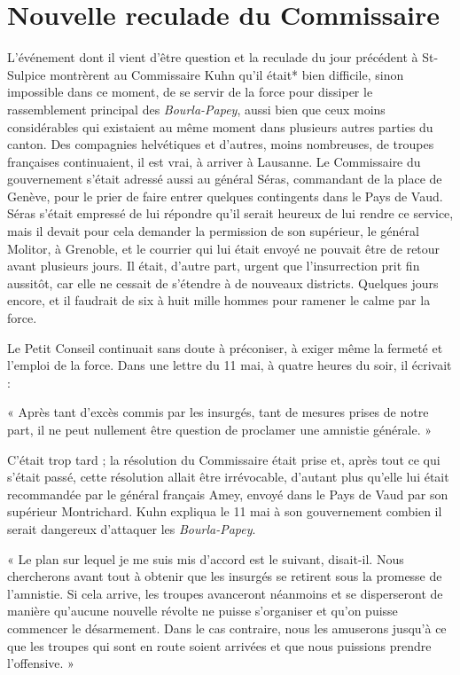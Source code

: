 \documentclass[french,twoside]{book} %
\newenvironment{quoteblock}%
  {\begin{quoting}}
  {\end{quoting}}
\newenvironment{quotebar}{%
    \def\FrameCommand{{\color{rubric!10!}\vrule width 0.5em} \hspace{0.9em}}%
    \def\OuterFrameSep{\itemsep} %
    \MakeFramed {\advance\hsize-\width \FrameRestore}
  }%
  {%
    \endMakeFramed
  }
\renewenvironment{quoteblock}%
  {%
    \savenotes
    \setstretch{0.9}
    \begin{quotebar}
  }
  {%
    \end{quotebar}
    \spewnotes
  }
\begin{document}
\section[Nouvelle reculade du Commissaire]{Nouvelle reculade du Commissaire}
\noindent L’événement dont il vient d’être question et la reculade du jour précédent à St-Sulpice montrèrent au Commissaire Kuhn qu’il était* bien difficile, sinon impossible dans ce moment, de se servir de la force pour dissiper le rassemblement principal des \emph{Bourla-Papey}, aussi bien que ceux moins considérables qui existaient au même moment dans plusieurs autres parties du canton. Des compagnies helvétiques et d’autres, moins nombreuses, de troupes françaises continuaient, il est vrai, à arriver à Lausanne. Le Commissaire du gouvernement s’était adressé aussi au général Séras, commandant de la place de Genève, pour le prier de faire entrer quelques contingents dans le Pays de Vaud. Séras s’était empressé de lui répondre qu’il serait heureux de lui rendre ce service, mais il devait pour cela demander la permission de son supérieur, le général Molitor, à Grenoble, et le courrier qui lui était envoyé ne pouvait être de retour avant plusieurs jours. Il était, d’autre part, urgent que l’insurrection prit fin aussitôt, car elle ne cessait de s’étendre à de nouveaux districts. Quelques jours encore, et il faudrait de six à huit mille hommes pour ramener le calme par la force.\par
Le Petit Conseil continuait sans doute à préconiser, à exiger même la fermeté et l’emploi de la force. Dans une lettre du 11 mai, à quatre heures du soir, il écrivait :\par

\begin{quoteblock}
\noindent « Après tant d’excès commis par les insurgés, tant de mesures prises de notre part, il ne peut nullement être question de proclamer une amnistie générale. »\end{quoteblock}

\noindent C’était trop tard ; la résolution du Commissaire était prise et, après tout ce qui s’était passé, cette résolution allait être irrévocable, d’autant plus qu’elle lui était recommandée par le général français Amey, envoyé dans le Pays de Vaud par son supérieur Montrichard. Kuhn expliqua le 11 mai à son gouvernement combien il serait dangereux d’attaquer les \emph{Bourla-Papey}.\par

\begin{quoteblock}
\noindent « Le plan sur lequel je me suis mis d’accord est le suivant, disait-il. Nous chercherons avant tout à obtenir que les insurgés se retirent sous la promesse de l’amnistie. Si cela arrive, les troupes avanceront néanmoins et se disperseront de manière qu’aucune nouvelle révolte ne puisse s’organiser et qu’on puisse commencer le désarmement. Dans le cas contraire, nous les amuserons jusqu’à ce que les troupes qui sont en route soient arrivées et que nous puissions prendre l’offensive. »\end{quoteblock}
\end{document}
